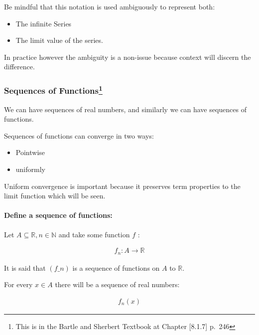 \documentclass[class=article, crop=false]{standalone}
\begin{document}
Be mindful that this notation is used ambiguously to represent both:

\begin{itemize}
\item
  The infinite Series
\item
  The limit value of the series.
\end{itemize}

In practice however the ambiguity is a non-issue because context will
discern the difference.

\hypertarget{sequences-of-functionstbook}{%
\subsubsection[Sequences of Functions]{\texorpdfstring{Sequences of
Functions\footnote{This is in the Bartle and Sherbert Textbook at
  Chapter {[}8.1.7{]} p.~246}}{Sequences of Functions}}\label{sequences-of-functionstbook}}

We can have sequences of real numbers, and similarly we can have
sequences of functions.

Sequences of functions can converge in two ways:

\begin{itemize}
\item
  Pointwise
\item
  uniformly
\end{itemize}

Uniform convergence is important because it preserves term properties to
the limit function which will be seen.

\hypertarget{define-a-sequence-of-functions}{%
\paragraph{Define a sequence of
functions:}\label{define-a-sequence-of-functions}}

Let $A \subseteq \mathbb{R} , n \in \mathbb{N}$ and take some
function \(f\) :


\begin{align*}
f_n: A     \rightarrow \mathbb{R}
\end{align*}

 It is said that $\left( f\_n \right)$ is a sequence of functions
on \(A\) to $\mathbb{R}$.

For every \(x \in A\) there will be a sequence of real numbers:


\begin{align*}
f_n\left( x \right)
\end{align*}
\end{document}
